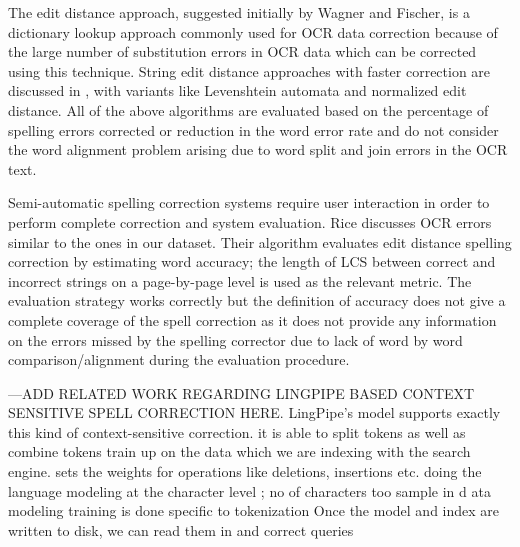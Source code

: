 The edit distance approach, suggested initially by Wagner and Fischer\cite{wagner1974string}, is a dictionary lookup approach commonly used for OCR data correction because of the large number of substitution errors in OCR data  \cite{kukich1992techniques}\cite{christen2006comparison} which can be corrected using this technique. String edit distance approaches with faster correction are discussed in \cite{marzal1993computation},\cite{schulz2002fast}  with variants like Levenshtein automata and normalized edit distance.
All of the above algorithms are evaluated based on the percentage of spelling errors corrected or reduction in the word error rate and do not consider the word alignment problem arising due to word split and join errors in the OCR text. 

Semi-automatic spelling correction systems \cite{taghva2001ocrspell} require user interaction in order to perform complete correction and system evaluation. Rice\cite{rice1996measuring} discusses OCR errors similar to the ones in our dataset. Their algorithm evaluates edit distance spelling correction by estimating word accuracy; the length of LCS between correct and incorrect strings on a page-by-page level is used as the relevant metric. 
The evaluation strategy works correctly but the definition of accuracy does not give a complete coverage of the spell correction as it does not provide any information on the errors missed by the spelling corrector due to lack of word by word comparison/alignment during the evaluation procedure.

---ADD RELATED WORK REGARDING LINGPIPE BASED CONTEXT SENSITIVE SPELL CORRECTION HERE. 
LingPipe's model supports exactly this kind of context-sensitive correction.
 it is able to split tokens as well as combine tokens
 train up on the data which we are indexing with the search engine. 
 sets the weights for operations like deletions, insertions etc.
doing the language modeling at the character level ; no of characters too sample in d ata modeling
training is done specific to tokenization
Once the model and index are written to disk, we can read them in and correct queries



